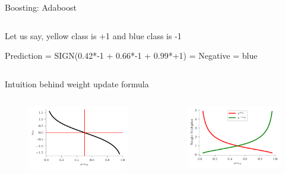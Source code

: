 \documentclass{beamer}
\begin{document}
\begin{frame}{Boosting: Adaboost}
\begin{columns}
	\begin{column}{0.5\textwidth}
		\pause Let us say, yellow class is +1 and blue class is -1
		
		\pause Prediction = SIGN(0.42*-1 + 0.66*-1 + 0.99*+1) = Negative = blue
	\end{column}
	\end{columns}

	\end{frame}
	
	
	\begin{frame}{Intuition behind weight update formula}
	\begin{columns}
\pause \begin{column}{0.5\textwidth}
	\begin{figure}
	\centering
	\includegraphics[scale=0.7]{alpha-boosting.pdf}
	
	\label{fig:alpha-boosting}
\end{figure}
\end{column}
\pause \begin{column}{0.5\textwidth}
	\begin{figure}
		\centering
		\includegraphics[scale=0.7]{alpha-boosting-weight.pdf}
		
		\label{fig:alpha-boosting}
	\end{figure}
\end{column}
	\end{columns}


\end{frame}
\end{document}
